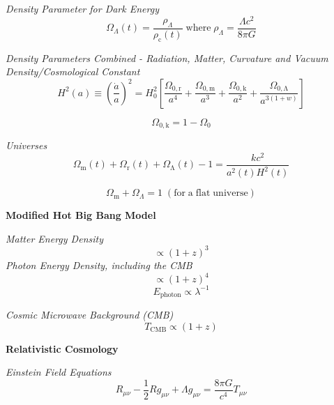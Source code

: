\documentclass{article}
\begin{document}
\textit {Density Parameter for Dark Energy}
\begin{equation}
\Omega_\Lambda(t) = \frac {\rho_\Lambda}{\rho_\mathrm{c}(t)} \; \mathrm{where} \; \rho_\Lambda = \frac {\Lambda c^2}{8 \pi G} 
\end{equation}


\textit {Density Parameters Combined - Radiation, Matter, Curvature and Vacuum Density/Cosmological Constant}
\begin{equation}
H^2(a) \equiv \left( \frac {\dot{a}}{a} \right)^2 = H^2_\mathrm{0} \left[ \frac {\Omega_\mathrm{0,r}}{a^4} + \frac {\Omega_\mathrm{0,m}}{a^3} + \frac {\Omega_\mathrm{0,k}}{a^2} + \frac {\Omega_\mathrm{0,\Lambda}}{a^{3(1+w)}} \right]
\end{equation}

\begin{equation}
\Omega_\mathrm{0,k} = 1 - \Omega_0
\end{equation}

\textit{Universes}
\begin{equation}
\Omega_\mathrm{m}(t) + \Omega_\mathrm{r}(t) + \Omega_\mathrm{\Lambda}(t) - 1 = \frac {k c^2}{a^2(t) H^2(t)}
\end{equation}

\begin{equation}
\Omega_\mathrm{m} + \Omega_{\Lambda} = 1 \; (\mathrm{for \; a \; flat \; universe})
\end{equation}
\begin{center}
\end{center}

\textbf{Modified Hot Big Bang Model}

\textit{Matter Energy Density}
\begin{equation}
\propto (1+z)^3
\end{equation}
\textit{Photon Energy Density, including the CMB}
\begin{equation}
\propto (1+z)^4
\end{equation}
\begin{equation}
E_\mathrm{photon} \propto \lambda^{-1}
\end{equation}

\textit{Cosmic Microwave Background (CMB)}
\begin{equation}
T_\mathrm{CMB} \propto (1+z)
\end{equation}


\textbf {Relativistic Cosmology}

\textit {Einstein Field Equations}
\begin{equation}
R_{\mu \nu} - \frac {1}{2} R g_{\mu \nu} +\Lambda g_{\mu \nu} = \frac {8 \pi G}{c^4} T_{\mu \nu}
\end{equation}
\end{document}
